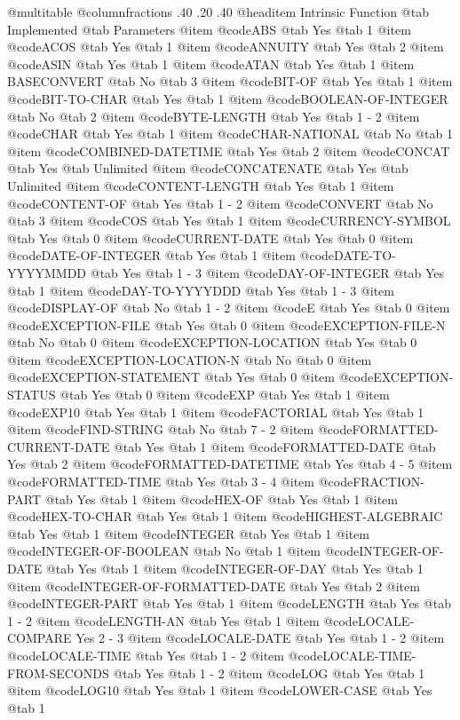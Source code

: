 @multitable @columnfractions .40 .20 .40
@headitem Intrinsic Function @tab Implemented @tab	Parameters
@item @code{ABS} @tab Yes @tab 1
@item @code{ACOS} @tab Yes @tab 1
@item @code{ANNUITY} @tab Yes @tab 2
@item @code{ASIN} @tab Yes @tab 1
@item @code{ATAN} @tab Yes @tab 1
@item {BASECONVERT} @tab No @tab 3
@item @code{BIT-OF} @tab Yes @tab 1
@item @code{BIT-TO-CHAR} @tab Yes @tab 1
@item @code{BOOLEAN-OF-INTEGER} @tab No @tab 2
@item @code{BYTE-LENGTH} @tab Yes @tab 1 - 2
@item @code{CHAR} @tab Yes @tab 1
@item @code{CHAR-NATIONAL} @tab No @tab 1
@item @code{COMBINED-DATETIME} @tab Yes @tab 2
@item @code{CONCAT} @tab Yes @tab Unlimited
@item @code{CONCATENATE} @tab Yes @tab Unlimited
@item @code{CONTENT-LENGTH} @tab Yes @tab 1
@item @code{CONTENT-OF} @tab Yes @tab 1 - 2
@item @code{CONVERT} @tab No @tab 3
@item @code{COS} @tab Yes @tab 1
@item @code{CURRENCY-SYMBOL} @tab Yes @tab 0
@item @code{CURRENT-DATE} @tab Yes @tab 0
@item @code{DATE-OF-INTEGER} @tab Yes @tab 1
@item @code{DATE-TO-YYYYMMDD} @tab Yes @tab 1 - 3
@item @code{DAY-OF-INTEGER} @tab Yes @tab 1
@item @code{DAY-TO-YYYYDDD} @tab Yes @tab 1 - 3
@item @code{DISPLAY-OF} @tab No @tab 1 - 2
@item @code{E} @tab Yes @tab 0
@item @code{EXCEPTION-FILE} @tab Yes @tab 0
@item @code{EXCEPTION-FILE-N} @tab No @tab 0
@item @code{EXCEPTION-LOCATION} @tab Yes @tab 0
@item @code{EXCEPTION-LOCATION-N} @tab No @tab 0
@item @code{EXCEPTION-STATEMENT} @tab Yes @tab 0
@item @code{EXCEPTION-STATUS} @tab Yes @tab 0
@item @code{EXP} @tab Yes @tab 1
@item @code{EXP10} @tab Yes @tab 1
@item @code{FACTORIAL} @tab Yes @tab 1
@item @code{FIND-STRING} @tab No @tab 7 - 2
@item @code{FORMATTED-CURRENT-DATE} @tab Yes @tab 1
@item @code{FORMATTED-DATE} @tab Yes @tab 2
@item @code{FORMATTED-DATETIME} @tab Yes @tab 4 - 5
@item @code{FORMATTED-TIME} @tab Yes @tab 3 - 4
@item @code{FRACTION-PART} @tab Yes @tab 1
@item @code{HEX-OF} @tab Yes @tab 1
@item @code{HEX-TO-CHAR} @tab Yes @tab 1
@item @code{HIGHEST-ALGEBRAIC} @tab Yes @tab 1
@item @code{INTEGER} @tab Yes @tab 1
@item @code{INTEGER-OF-BOOLEAN} @tab No @tab 1
@item @code{INTEGER-OF-DATE} @tab Yes @tab 1
@item @code{INTEGER-OF-DAY} @tab Yes @tab 1
@item @code{INTEGER-OF-FORMATTED-DATE} @tab Yes @tab 2
@item @code{INTEGER-PART} @tab Yes @tab 1
@item @code{LENGTH} @tab Yes @tab 1 - 2
@item @code{LENGTH-AN} @tab Yes @tab 1
@item @code{LOCALE-COMPARE	Yes	2 - 3}
@item @code{LOCALE-DATE} @tab Yes @tab 1 - 2
@item @code{LOCALE-TIME} @tab Yes @tab 1 - 2
@item @code{LOCALE-TIME-FROM-SECONDS} @tab Yes @tab 1 - 2
@item @code{LOG} @tab Yes @tab 1
@item @code{LOG10} @tab Yes @tab 1
@item @code{LOWER-CASE} @tab Yes @tab 1
